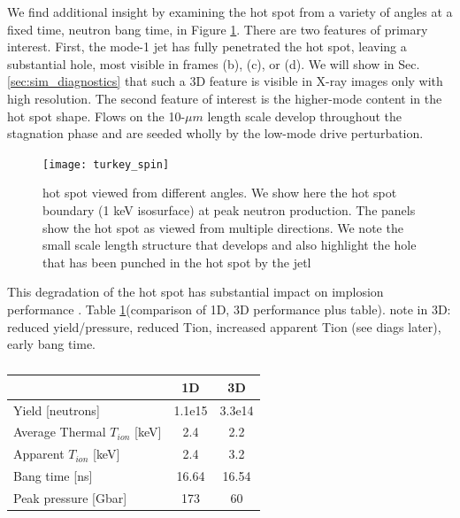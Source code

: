\documentclass[aip,pop,numerical,reprint,floatfix]{revtex4-1}
\providecommand{\tabularnewline}{\\}
\begin{document}
We find additional insight by examining the hot spot from a variety
of angles at a fixed time, neutron bang time, in Figure \ref{fig:3d_spin}.
There are two features of primary interest. First, the mode-1 jet
has fully penetrated the hot spot, leaving a substantial hole, most
visible in frames (b), (c), or (d). We will show in Sec. \ref{sec:sim_diagnostics}
that such a 3D feature is visible in X-ray images only with high resolution.
The second feature of interest is the higher-mode content in the hot
spot shape. Flows on the 10-$\mu m$ length scale develop throughout
the stagnation phase and are seeded wholly by the low-mode drive perturbation.

\begin{figure}[htb]
\begin{centering}
\texttt{[image: turkey\_spin]}
\par\end{centering}
\caption{\label{fig:3d_spin}hot spot viewed from different angles. We show here the hot spot boundary (1 keV isosurface) at peak neutron production. The panels show the hot spot as viewed from multiple directions. We note the small scale length structure that develops and also highlight the hole that has been punched in the hot spot by the jetl}
\end{figure}

This degradation of the hot spot has substantial impact on implosion
performance \cite{spears_metrics_pop_invited_2012}. Table \ref{tab:1d_3d_performance}(comparison
of 1D, 3D performance plus table). note in 3D: reduced yield/pressure,
reduced Tion, increased apparent Tion (see diags later), early bang
time.

\begin{table}[h]
\begin{centering}
\begin{tabular}{|l|c|c|}
\hline 
 & 1D & 3D\tabularnewline
\hline 
\hline 
Yield {[}neutrons{]} & 1.1e15 & 3.3e14\tabularnewline
\hline 
Average Thermal $T_{ion}$ {[}keV{]} & 2.4 & 2.2\tabularnewline
\hline 
Apparent $T_{ion}$ {[}keV{]} & 2.4 & 3.2\tabularnewline
\hline 
Bang time {[}ns{]} & 16.64 & 16.54\tabularnewline
\hline 
Peak pressure {[}Gbar{]} & 173 & 60\tabularnewline
\hline 
\end{tabular}
\par\end{centering}
\caption{\label{tab:1d_3d_performance}}
\end{table}
\end{document}
